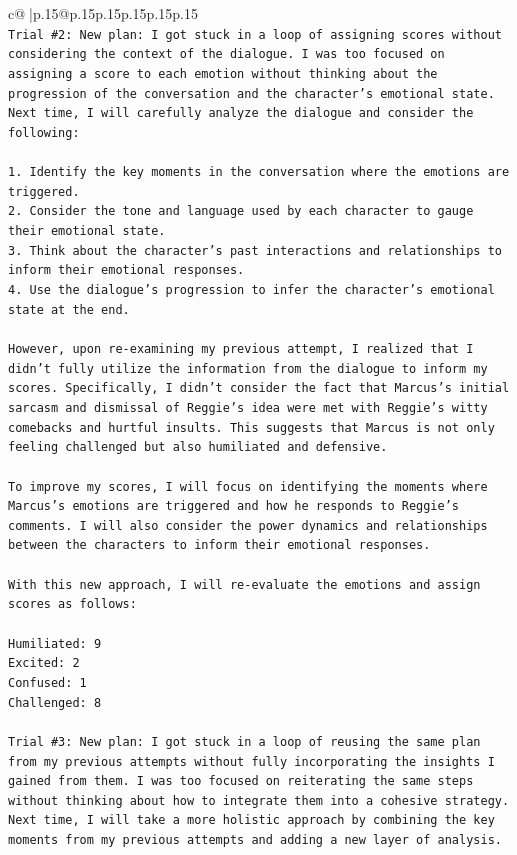 \documentclass{article}
\begin{document}
{\begin{supertabular}{c@{$\;$}|p{.15\linewidth}@{}p{.15\linewidth}p{.15\linewidth}p{.15\linewidth}p{.15\linewidth}p{.15\linewidth}}
{{{\\ 
\texttt{Trial \#2: New plan: I got stuck in a loop of assigning scores without considering the context of the dialogue. I was too focused on assigning a score to each emotion without thinking about the progression of the conversation and the character's emotional state. Next time, I will carefully analyze the dialogue and consider the following:} \\
\\ 
\texttt{1. Identify the key moments in the conversation where the emotions are triggered.} \\
\texttt{2. Consider the tone and language used by each character to gauge their emotional state.} \\
\texttt{3. Think about the character's past interactions and relationships to inform their emotional responses.} \\
\texttt{4. Use the dialogue's progression to infer the character's emotional state at the end.} \\
\\ 
\texttt{However, upon re{-}examining my previous attempt, I realized that I didn't fully utilize the information from the dialogue to inform my scores. Specifically, I didn't consider the fact that Marcus's initial sarcasm and dismissal of Reggie's idea were met with Reggie's witty comebacks and hurtful insults. This suggests that Marcus is not only feeling challenged but also humiliated and defensive.} \\
\\ 
\texttt{To improve my scores, I will focus on identifying the moments where Marcus's emotions are triggered and how he responds to Reggie's comments. I will also consider the power dynamics and relationships between the characters to inform their emotional responses.} \\
\\ 
\texttt{With this new approach, I will re{-}evaluate the emotions and assign scores as follows:} \\
\\ 
\texttt{Humiliated: 9} \\
\texttt{Excited: 2} \\
\texttt{Confused: 1} \\
\texttt{Challenged: 8} \\
\\ 
\texttt{Trial \#3: New plan: I got stuck in a loop of reusing the same plan from my previous attempts without fully incorporating the insights I gained from them. I was too focused on reiterating the same steps without thinking about how to integrate them into a cohesive strategy. Next time, I will take a more holistic approach by combining the key moments from my previous attempts and adding a new layer of analysis.} \\
}}}
\end{supertabular}}
\end{document}
